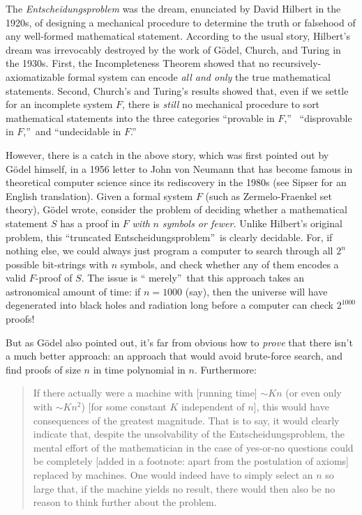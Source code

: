 \documentclass[12pt,onecolumn]{article}%
\begin{document}
The \textit{Entscheidungsproblem} was the dream, enunciated by David Hilbert
in the 1920s, of designing a mechanical procedure to determine the truth or
falsehood of any well-formed mathematical statement. According to the usual
story, Hilbert's dream was irrevocably destroyed by the work of G\"{o}del,
Church, and Turing in the 1930s. First, the Incompleteness Theorem showed
that no recursively-axiomatizable formal system can encode \textit{all and
only} the true mathematical statements. Second, Church's and Turing's
results showed that, even if we settle for an incomplete system $F$, there is
\textit{still} no mechanical procedure to sort mathematical statements into
the three categories \textquotedblleft provable in $F$,\textquotedblright\ %
 \textquotedblleft disprovable in $F$,\textquotedblright\  and
\textquotedblleft undecidable in $F$.\textquotedblright

However, there is a catch in the above story, which was first pointed out by
G\"{o}del himself, in a 1956 letter to John von Neumann that has become
famous in theoretical computer science since its rediscovery in the 1980s (see
Sipser \cite{sipser:pnp} for an English translation). Given a formal system
$F$ (such as Zermelo-Fraenkel set theory), G\"{o}del wrote, consider the
problem of deciding whether a mathematical statement $S$ has a proof in $F$
\textit{with }$n$\textit{ symbols or fewer. }Unlike Hilbert's original
problem, this \textquotedblleft truncated
Entscheidungsproblem\textquotedblright\ is clearly decidable. For, if
nothing else, we could always just program a computer to search through all
$2^{n}$ possible bit-strings with $n$ symbols, and check whether any of them
encodes a valid $F$-proof of $S$. The issue is \textquotedblleft
merely\textquotedblright\ that this approach takes an astronomical amount of
time: if $n=1000$ (say), then the universe will have degenerated into black
holes and radiation long before a computer can check $2^{1000}$ proofs!

But as G\"{o}del also pointed out, it's far from obvious how to
\textit{prove} that there isn't a much better approach: an approach that would
avoid brute-force search, and find proofs of size $n$ in time polynomial in
$n$. Furthermore:

\begin{quotation}
\noindent If there actually were a machine with [running time] $\sim Kn$ (or
even only with $\sim Kn^{2}$) [for some constant $K$ independent of $n$], this
would have consequences of the greatest magnitude. That is to say, it would
clearly indicate that, despite the unsolvability of the Entscheidungsproblem,
the mental effort of the mathematician in the case of yes-or-no questions
could be completely [added in a footnote: apart from the postulation of
axioms] replaced by machines. One would indeed have to simply select an $n$
so large that, if the machine yields no result, there would then also be no
reason to think further about the problem.
\end{quotation}
\end{document}
